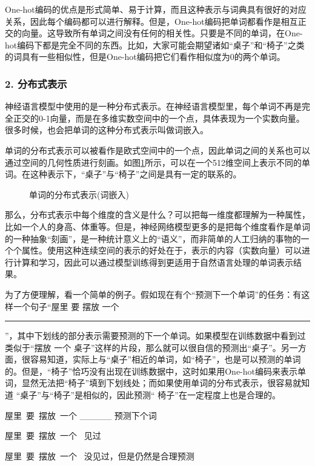 \parinterval  One-hot编码的优点是形式简单、易于计算，而且这种表示与词典具有很好的对应关系，因此每个编码都可以进行解释。但是，One-hot编码把单词都看作是相互正交的向量。这导致所有单词之间没有任何的相关性。只要是不同的单词，在One-hot编码下都是完全不同的东西。比如，大家可能会期望诸如“桌子”和“椅子”之类的词具有一些相似性，但是One-hot编码把它们看作相似度为0的两个单词。


\subsubsection{2. 分布式表示}

\parinterval  神经语言模型中使用的是一种分布式表示。在神经语言模型里，每个单词不再是完全正交的0-1向量，而是在多维实数空间中的一个点，具体表现为一个实数向量。很多时候，也会把单词的这种分布式表示叫做词嵌入。

\parinterval  单词的分布式表示可以被看作是欧式空间中的一个点，因此单词之间的关系也可以通过空间的几何性质进行刻画。如图\ref{fig:9-65}所示，可以在一个512维空间上表示不同的单词。在这种表示下，“桌子”与“椅子”之间是具有一定的联系的。

\begin{figure}[htp]
\centering

\caption{单词的分布式表示(词嵌入) }
\label{fig:9-65}
\end{figure}

\parinterval  那么，分布式表示中每个维度的含义是什么？可以把每一维度都理解为一种属性，比如一个人的身高、体重等。但是，神经网络模型更多的是把每个维度看作是单词的一种抽象“刻画”，是一种统计意义上的“语义”，而非简单的人工归纳的事物的一个个属性。使用这种连续空间的表示的好处在于，表示的内容（实数向量）可以进行计算和学习，因此可以通过模型训练得到更适用于自然语言处理的单词表示结果。

\parinterval  为了方便理解，看一个简单的例子。假如现在有个“预测下一个单词”的任务：有这样一个句子“屋里 要 摆放 一个 \rule[-3pt]{1cm}{0.05em}”，其中下划线的部分表示需要预测的下一个单词。如果模型在训练数据中看到过类似于“摆放 一个 桌子”这样的片段，那么就可以很自信的预测出“桌子”。另一方面，很容易知道，实际上与“桌子”相近的单词，如“椅子”，也是可以预测的单词的。但是，“椅子”恰巧没有出现在训练数据中，这时如果用One-hot编码来表示单词，显然无法把“椅子”填到下划线处；而如果使用单词的分布式表示，很容易就知道 “桌子”与“椅子”是相似的，因此预测“ 椅子”在一定程度上也是合理的。
\begin{example}
屋里\ 要\ 摆放\ 一个 \_\_\_\_\_ \hspace{0.5em} \quad \quad 预测下个词

\hspace{2em} 屋里\ 要\ 摆放\ 一个\ { } \hspace{3.2em}见过

\hspace{2em} 屋里\ 要\ 摆放\ 一个\ { } \hspace{3.2em}没见过，但是仍然是合理预测
\end{example}

